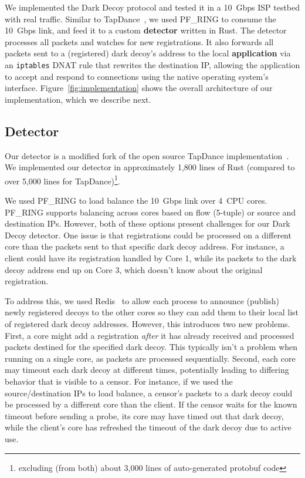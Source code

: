 \documentclass[letterpaper,twocolumn,10pt]{article}
\begin{document}
We implemented the Dark Decoy protocol and tested it in a 10~Gbps ISP testbed
with real traffic. Similar to TapDance~\cite{tapdance}, we used PF\_RING to
consume the 10~Gbps link, and feed it to a custom \textbf{detector} written in Rust. The
detector processes all packets and watches for new registrations. It also
forwards all packets sent to a (registered) dark decoy's address to the local
\textbf{application} via an \texttt{iptables} DNAT rule that rewrites the destination IP,
allowing the application to accept and respond to connections using the native
operating system's interface. Figure~\ref{fig:implementation} shows the overall
architecture of our implementation, which we describe next.

\FigImplementation

\subsection{Detector}

Our detector is a modified fork of the open source TapDance
implementation~\cite{tapdance-source}.
We implemented our detector in approximately 1,800 lines of Rust (compared to
over 5,000 lines for TapDance)\footnote{excluding (from both) about 3,000 lines
of auto-generated protobuf code}.

We used PF\_RING to load balance the 10~Gbps link over 4~CPU cores. PF\_RING
supports balancing across cores based on flow (5-tuple) or source and
destination IPs. However, both of these options present challenges for our Dark
Decoy detector. One issue is that registrations could be processed on a
different core than the packets sent to that specific dark decoy address. For
instance, a client could have its registration handled by Core 1, while its
packets to the dark decoy address end up on Core 3, which doesn't know about the
original registration.

To address this, we used Redis~\cite{redis} to allow each process to announce
(publish) newly registered decoys to the other cores so they can
add them to their local list of registered dark decoy addresses.
However, this introduces two new problems. First, a core might add a
registration \emph{after} it has already received and processed packets destined
for the specified dark decoy. This typically isn't a problem when running on a
single core, as packets are processed sequentially. Second, each core may
timeout each dark decoy at different times, potentially leading to differing
behavior that is visible to a censor. For instance, if we used the
source/destination IPs to load balance, a censor's packets to a dark decoy could
be processed by a different core than the client. If the censor waits for the
known timeout before sending a probe, its core may have timed out that dark
decoy, while the client's core has refreshed the timeout of the dark decoy due
to active use.
\end{document}
